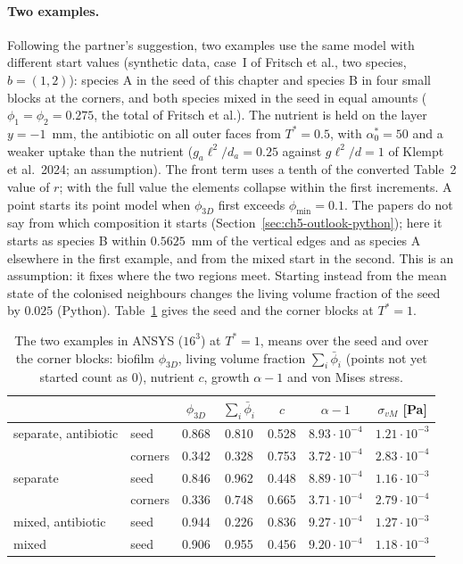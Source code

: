 \paragraph{Two examples.}
Following the partner's suggestion, two examples use the same model with different start values
(synthetic data, case~I of Fritsch et al., two species, $b=(1,2)$): species A in the seed of this chapter
and species B in four small blocks at the corners, and both species mixed in the seed in equal amounts
($\phi_1=\phi_2=0.275$, the total of Fritsch et al.). The nutrient is held on the layer $y=-1$~mm, the
antibiotic on all outer faces from $T^*=0.5$, with $\alpha^*_0=50$ and a weaker uptake than the nutrient
($g_a\ell^2/d_a=0.25$ against $g\ell^2/d=1$ of Klempt et al.\ 2024; an assumption). The front term uses a tenth of the converted Table~2 value
of $r$; with the full value the elements collapse within the first increments. A point starts its point model
when $\phi_{3D}$ first exceeds $\phi_{\min}=0.1$. The papers do not say from which composition it starts
(Section~\ref{sec:ch5-outlook-python}); here it starts as species B within $0.5625$~mm of the vertical edges
and as species A elsewhere in the first example, and from the mixed start in the second. This is an
assumption: it fixes where the two regions meet. Starting instead from the mean state of the colonised
neighbours changes the living volume fraction of the seed by $0.025$ (Python).
Table~\ref{tab:ch5-living} gives the seed and the corner blocks at $T^*=1$.

\begin{table}[htbp]
  \centering
  \caption[The coupled examples]{%
    The two examples in ANSYS ($16^3$) at $T^*=1$, means over the seed and over the corner blocks:
    biofilm $\phi_{3D}$, living volume fraction $\sum_i\bar\phi_i$ (points not yet started count as $0$),
    nutrient $c$, growth $\alpha-1$ and von Mises stress.}
  \label{tab:ch5-living}
  \begin{tabular}{llccccc}
    \toprule
    & & $\phi_{3D}$ & $\sum_i\bar\phi_i$ & $c$ & $\alpha-1$ & $\sigma_{vM}$ [Pa]\\
    \midrule
    separate, antibiotic & seed & 0.868 & 0.810 & 0.528 & $8.93\cdot10^{-4}$ & $1.21\cdot10^{-3}$\\
    & corners & 0.342 & 0.328 & 0.753 & $3.72\cdot10^{-4}$ & $2.83\cdot10^{-4}$\\
    separate & seed & 0.846 & 0.962 & 0.448 & $8.89\cdot10^{-4}$ & $1.16\cdot10^{-3}$\\
    & corners & 0.336 & 0.748 & 0.665 & $3.71\cdot10^{-4}$ & $2.79\cdot10^{-4}$\\
    mixed, antibiotic & seed & 0.944 & 0.226 & 0.836 & $9.27\cdot10^{-4}$ & $1.27\cdot10^{-3}$\\
    mixed & seed & 0.906 & 0.955 & 0.456 & $9.20\cdot10^{-4}$ & $1.18\cdot10^{-3}$\\
    \bottomrule
  \end{tabular}
\end{table}

